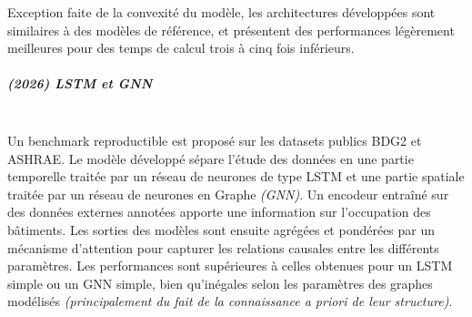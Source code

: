                     Exception faite de la convexité du modèle, les architectures développées sont
                    similaires à des modèles de référence, et présentent des performances légèrement
                    meilleures pour des temps de calcul trois à cinq fois inférieurs.
                \subparagraph{(2026) LSTM et GNN}\cite{refId0}\\
                    Un benchmark reproductible est proposé sur les datasets publics BDG2\cite{bdg2} et
                    ASHRAE\cite{ashrae-energy-prediction}.
                    Le modèle développé sépare l'étude des données en une partie temporelle traitée par
                    un réseau de neurones de type LSTM et une partie spatiale traitée par un réseau
                    de neurones en Graphe \textit{(GNN)}.
                    Un encodeur entraîné sur des données externes annotées apporte une information
                    sur l'occupation des bâtiments.
                    Les sorties des modèles sont ensuite agrégées et pondérées par un mécanisme
                    d'attention pour capturer les relations causales entre les différents paramètres.
                    Les performances sont supérieures à celles obtenues pour un LSTM simple ou un
                    GNN simple, bien qu'inégales selon les paramètres des graphes modélisés
                    \textit{(principalement du fait de la connaissance a priori de leur structure)}.\newpage
